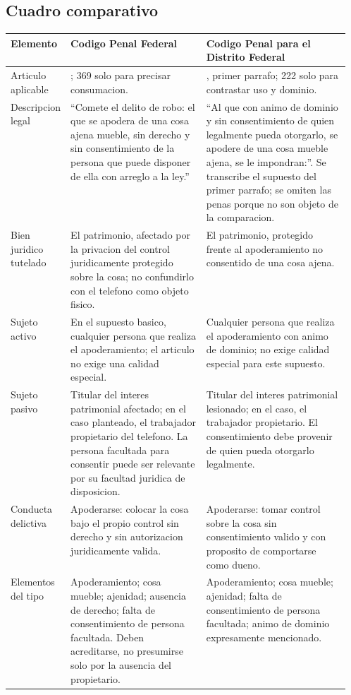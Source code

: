 \documentclass[spanish,letterpaper,oneside]{article}
\begin{document}
\begin{landscape}
\thispagestyle{empty}
\subsection{Cuadro comparativo}\label{cuadro-comparativo}
\begingroup
{}
\footnotesize
\setlength{\tabcolsep}{5pt}
\renewcommand{\arraystretch}{1.15}
\noindent\begin{tabular}{@{}
  >{\raggedright\arraybackslash}p{0.16\linewidth}
  >{\raggedright\arraybackslash}p{0.40\linewidth}
  >{\raggedright\arraybackslash}p{}@{}}
\toprule
\textbf{Elemento} & \textbf{Codigo Penal Federal} &
\textbf{Codigo Penal para el Distrito Federal} \\
\midrule
Articulo aplicable & 367; 369 solo para precisar consumacion. & 220,
primer parrafo; 222 solo para contrastar uso y dominio. \\
Descripcion legal & ``Comete el delito de robo: el que se apodera de una
cosa ajena mueble, sin derecho y sin consentimiento de la persona que
puede disponer de ella con arreglo a la ley.'' & ``Al que con animo de
dominio y sin consentimiento de quien legalmente pueda otorgarlo, se
apodere de una cosa mueble ajena, se le impondran:''. Se transcribe el
supuesto del primer parrafo; se omiten las penas porque no son objeto de
la comparacion. \\
Bien juridico tutelado & El patrimonio, afectado por la privacion del
control juridicamente protegido sobre la cosa; no confundirlo con el
telefono como objeto fisico. & El patrimonio, protegido frente al
apoderamiento no consentido de una cosa ajena. \\
Sujeto activo & En el supuesto basico, cualquier persona que realiza el
apoderamiento; el articulo no exige una calidad especial. & Cualquier
persona que realiza el apoderamiento con animo de dominio; no exige
calidad especial para este supuesto. \\
Sujeto pasivo & Titular del interes patrimonial afectado; en el caso
planteado, el trabajador propietario del telefono. La persona facultada
para consentir puede ser relevante por su facultad juridica de
disposicion. & Titular del interes patrimonial lesionado; en el caso, el
trabajador propietario. El consentimiento debe provenir de quien pueda
otorgarlo legalmente. \\
Conducta delictiva & Apoderarse: colocar la cosa bajo el propio control
sin derecho y sin autorizacion juridicamente valida. & Apoderarse: tomar
control sobre la cosa sin consentimiento valido y con proposito de
comportarse como dueno. \\
Elementos del tipo & Apoderamiento; cosa mueble; ajenidad; ausencia de
derecho; falta de consentimiento de persona facultada. Deben
acreditarse, no presumirse solo por la ausencia del propietario. &
Apoderamiento; cosa mueble; ajenidad; falta de consentimiento de persona
facultada; animo de dominio expresamente mencionado. \\
\bottomrule
\end{tabular}


\end{landscape}
\end{document}
